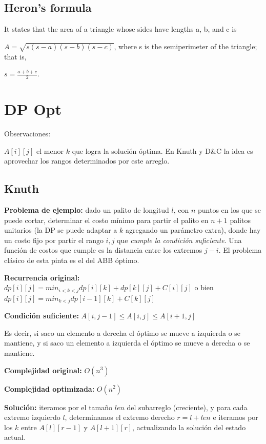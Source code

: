 \subsection{Heron's formula}
{
It states that the area of a triangle whose sides have lengths a, b, and c is

\( {\displaystyle A={\sqrt {s(s-a)(s-b)(s-c)}}} \),
where s is the semiperimeter of the triangle; that is,

\( {\displaystyle s={\frac {a+b+c}{2}}} \).
}

\section{DP Opt}
Observaciones:

$A[i][j]$ el menor $k$ que logra la solución óptima. En Knuth y D\&C la idea es aprovechar los rangos
determinados por este arreglo.

\subsection{Knuth}
{
    \textbf{Problema de ejemplo:} dado un palito de longitud $l$, con $n$ puntos en los que se puede cortar,
    determinar el costo mínimo para partir el palito en $n+1$ palitos unitarios (la DP se puede adaptar a $k$ 
    agregando un parámetro extra), donde hay un costo fijo por partir el rango $i, j$ que \emph{cumple la 
    condición suficiente}. Una función de costos que cumple es la distancia entre los extremos $j-i$. 
    El problema clásico de esta pinta es el del ABB óptimo.

    \textbf{Recurrencia original:} $dp[i][j] = min_{i < k < j} {dp[i][k] + dp[k][j]} + C[i][j]$ o bien 
		$dp[i][j] = min_{k < j}{dp[i - 1][k] + C[k][j]}$

    \textbf{Condición suficiente:} $A[i, j - 1] \leq  A[i, j] \leq A[i + 1, j]$

    Es decir, si saco un elemento a derecha el óptimo se mueve a izquierda o se mantiene, y 
    si saco un elemento a izquierda el óptimo se mueve a derecha o se mantiene.

    \textbf{Complejidad original:} $O(n^3)$

    \textbf{Complejidad optimizada:} $O(n^2)$

    \textbf{Solución:} iteramos por el tamaño $len$ del subarreglo (creciente), y para cada extremo izquierdo $l$,
    determinamos el extremo derecho $r=l+len$ e iteramos por los $k$ entre $A[l][r-1]$ y $A[l+1][r]$, actualizando la
    solución del estado actual.

}
